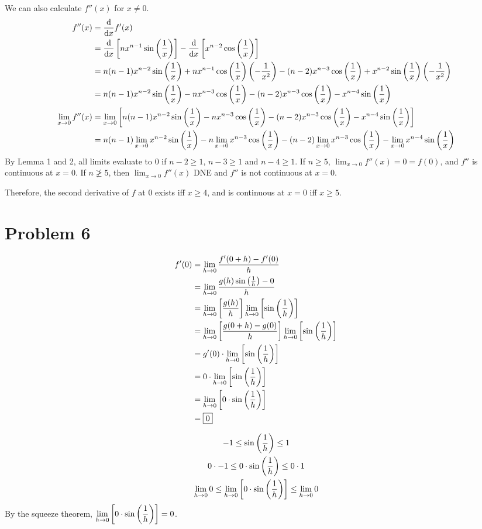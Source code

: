 \documentclass{article}
\newcommand*{\paren}[1]{\ensuremath\left(#1\right)}
\newcommand*{\problem}[1]{\section*{Problem #1}}
\newcommand*{\limit}[2][x]{\ensuremath{\displaystyle\lim_{#1\to#2}}}
\newcommand*{\Limit}[3][x]{\ensuremath{\displaystyle\lim_{#1\to#2}\left[#3\right]}}
\newcommand*{\deriv}[1][x]{\ensuremath{\dfrac{\mathrm{d}}{\mathrm{d}#1}}}
\newcommand*{\Deriv}[2][x]{\ensuremath{\dfrac{\mathrm{d}}{\mathrm{d}#1}\left[#2\right]}}
\begin{document}
We can also calculate $f''(x)$ for $x\neq0$.
\begin{align*}
	f''(x)&=\deriv f'(x) \\
	&=\Deriv{nx^{n-1}\sin\paren{\frac{1}{x}}}-\Deriv{x^{n-2}\cos\paren{\frac{1}{x}}} \\
	&=n(n-1)x^{n-2}\sin\paren{\frac{1}{x}}+nx^{n-1}\cos\paren{\frac{1}{x}}\paren{-\frac{1}{x^2}}-(n-2)x^{n-3}\cos\paren{\frac{1}{x}}+x^{n-2}\sin\paren{\frac{1}{x}}\paren{-\frac{1}{x^2}} \\
	&=n(n-1)x^{n-2}\sin\paren{\frac{1}{x}}-nx^{n-3}\cos\paren{\frac{1}{x}}-(n-2)x^{n-3}\cos\paren{\frac{1}{x}}-x^{n-4}\sin\paren{\frac{1}{x}} \\
	\limit{0}f''(x)&=\Limit{0}{n(n-1)x^{n-2}\sin\paren{\frac{1}{x}}-nx^{n-3}\cos\paren{\frac{1}{x}}-(n-2)x^{n-3}\cos\paren{\frac{1}{x}}-x^{n-4}\sin\paren{\frac{1}{x}}} \\
	&=n(n-1)\limit{0}x^{n-2}\sin\paren{\frac{1}{x}}-n\limit{0}x^{n-3}\cos\paren{\frac{1}{x}}-(n-2)\limit{0}x^{n-3}\cos\paren{\frac{1}{x}}-\limit{0}x^{n-4}\sin\paren{\frac{1}{x}}
\end{align*}
By Lemma 1 and 2, all limits evaluate to $0$ if $n-2\geq1$, $n-3\geq1$ and $n-4\geq1$. If $n\geq5$, $\limit{0}f''(x)=0=f(0)$, and $f''$ is continuous at $x=0$. If $n\not\geq5$, then $\limit{0}f''(x)$ DNE and $f''$ is not continuous at $x=0$.

Therefore, the second derivative of $f$ at $0$ exists iff $x\geq4$, and is continuous at $x=0$ iff $x\geq5$.

\problem{6}
\begin{minipage}[t]{0.53\linewidth}
	\begin{align*}
		f'(0)&=\limit[h]{0}\frac{f'(0+h)-f'(0)}{h} \\
		&=\limit[h]{0}\frac{g(h)\sin\paren{\frac{1}{h}}-0}{h} \\
		&=\Limit[h]{0}{\frac{g(h)}{h}}\Limit[h]{0}{\sin\paren{\frac{1}{h}}} \\
		&=\Limit[h]{0}{\frac{g(0+h)-g(0)}{h}}\Limit[h]{0}{\sin\paren{\frac{1}{h}}} \\
		&=g'(0)\cdot\Limit[h]{0}{\sin\paren{\frac{1}{h}}} \\
		&=0\cdot\Limit[h]{0}{\sin\paren{\frac{1}{h}}} \\
		&=\Limit[h]{0}{0\cdot\sin\paren{\frac{1}{h}}} \\
		&=\boxed{0}
	\end{align*}
\end{minipage}
\begin{minipage}[t]{0.47\linewidth}
	\begin{gather*}
		-1\leq\sin\paren{\frac{1}{h}}\leq1 \\
		0\cdot-1\leq0\cdot\sin\paren{\frac{1}{h}}\leq0\cdot1 \\
		\limit[h]{0}0\leq\Limit[h]{0}{0\cdot\sin\paren{\frac{1}{h}}}\leq\limit[h]{0}0
	\end{gather*}
	By the squeeze theorem, $\Limit[h]{0}{0\cdot\sin\paren{\frac{1}{h}}}=0$.
\end{minipage}
\end{document}
